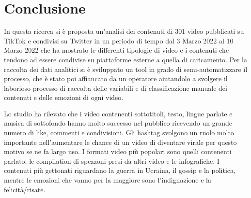 \section{Conclusione}

In questa ricerca si è proposta un'analisi dei contenuti di 301 video pubblicati su TikTok e condivisi su Twitter in un 
periodo di tempo dal 3 Marzo 2022 al 10 Marzo 2022 che ha mostrato le differenti tipologie di video e i contenuti che tendono 
ad essere condivise su piattaforme esterne a quella di caricamento.
Per la raccolta dei dati analitici si è sviluppato un tool in grado di semi-automatizzare il processo, che è stato poi affiancato 
da un operatore aiutandolo a svolgere il laborioso processo di raccolta delle variabili e di classificazione manuale dei contenuti 
e delle emozioni di ogni video.

Lo studio ha rilevato che i video contenenti sottotitoli, testo, lingue parlate e musica di sottofondo hanno molto successo nel 
pubblico ricevendo un grande numero di like, commenti e condivisioni. 
Gli hashtag svolgono un ruolo molto importante nell'aumentare le chance di un video di diventare virale per questo motivo se ne fa 
largo uso.
I formati video più popolari sono quelli contenenti parlato, le compilation di spezzoni presi da altri video e le infografiche. 
I contenuti più gettonati riguardano la guerra in Ucraina, il gossip e la politica, mentre le emozioni che vanno per la maggiore 
sono l'indignazione e la felicità/risate.